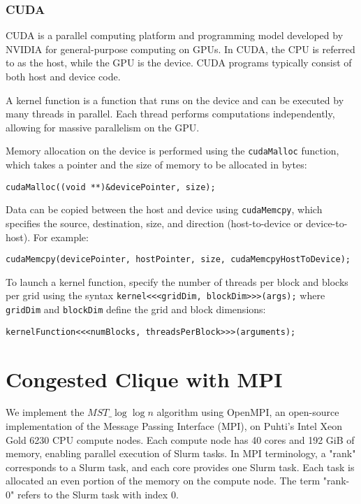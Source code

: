 \documentclass[english, 12pt, a4paper, elec, utf8, a-2b, online]{aaltothesis}
\newcommand{\mstalgo}{$MST\_\log\log{n}$}
\begin{document}
\subsubsection{CUDA}
CUDA is a parallel computing platform and programming model developed by NVIDIA for general-purpose computing on GPUs. In CUDA, the CPU is referred to as the host, while the GPU is the device. CUDA programs typically consist of both host and device code.

A kernel function is a function that runs on the device and can be executed by many threads in parallel. Each thread performs computations independently, allowing for massive parallelism on the GPU.

Memory allocation on the device is performed using the \texttt{cudaMalloc} function, which takes a pointer and the size of memory to be allocated in bytes:
\begin{verbatim}
cudaMalloc((void **)&devicePointer, size);
\end{verbatim}

Data can be copied between the host and device using \texttt{cudaMemcpy}, which specifies the source, destination, size, and direction (host-to-device or device-to-host). For example:
\begin{verbatim}
cudaMemcpy(devicePointer, hostPointer, size, cudaMemcpyHostToDevice);
\end{verbatim}

To launch a kernel function, specify the number of threads per block and blocks per grid using the syntax \texttt{kernel<<<gridDim, blockDim>>>(args);} where \texttt{gridDim} and \texttt{blockDim} define the grid and block dimensions:
\begin{verbatim}
kernelFunction<<<numBlocks, threadsPerBlock>>>(arguments);
\end{verbatim}

\clearpage

\section{Congested Clique with MPI}
\label{sec:mpi}
We implement the \mstalgo{} algorithm using OpenMPI, an open-source implementation of the Message Passing Interface (MPI), on Puhti's Intel Xeon Gold 6230 CPU compute nodes. Each compute node has 40 cores and 192 GiB of memory, enabling parallel execution of Slurm tasks. In MPI terminology, a "rank" corresponds to a Slurm task, and each core provides one Slurm task. Each task is allocated an even portion of the memory on the compute node. The term "rank-0" refers to the Slurm task with index 0.
\end{document}
